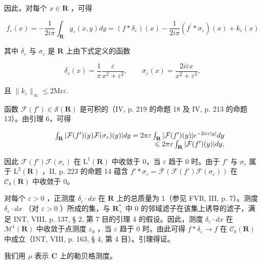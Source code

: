 因此，对每个 \(x \in \mathbf{R}\) ，可得

\[
f _ {\varepsilon} (x) = - \frac {1}{2 i \pi} \int_ {\mathbf {R}} g _ {\varepsilon} (x, y) d y = (f * \delta_ {\varepsilon}) (x) - \frac {1}{2 i \pi} (f ^ {\prime} * \sigma_ {\varepsilon}) (x) + k _ {\varepsilon} (x)
\]

其中 \(\delta_{\varepsilon}\) 与 \(\sigma_{\varepsilon}\) 是 \(\mathbf{R}\) 上由下式定义的函数

\[
\delta_ {\varepsilon} (x) = \frac {1}{\pi} \frac {\varepsilon}{x ^ {2} + \varepsilon^ {2}}, \qquad \sigma_ {\varepsilon} (x) = \frac {2 i \varepsilon x}{x ^ {2} + \varepsilon^ {2}},
\]

且 \(\| k_{\varepsilon}\|_{\infty}\leqslant 2\mathrm{Mr}\varepsilon .\)

函数 \(\mathcal{F}(f') \in \mathcal{S}(\mathbf{R})\) 是可积的（IV, p. 219 的命题 18 及 IV, p. 213 的命题 13）。由引理 6，可得

\[
\begin{array}{r l r} & & {\int_ {\mathbf {R}} | \mathcal {F} (f ^ {\prime}) (y) \mathcal {F} (\sigma_ {\varepsilon}) (y) | d y = 2 \pi \varepsilon \int_ {\mathbf {R}} | \mathcal {F} (f ^ {\prime}) (y) | e ^ {- 2 \pi \varepsilon | y |} d y} \\ & & {\leqslant 2 \pi \varepsilon \int_ {\mathbf {R}} | \mathcal {F} (f ^ {\prime}) (y) | d y,} \end{array}
\]

因此 \(\mathcal{F}(f')\mathcal{F}(\sigma_{\varepsilon})\) 在 \(\mathrm{L}^{1}(\mathbf{R})\) 中收敛于 0，当 \(\varepsilon\) 趋于 0 时。由于 \(f'\) 与 \(\sigma_{\varepsilon}\) 属于 \(\mathrm{L}^{2}(\mathbf{R})\) ，II, p. 223 的命题 14 蕴含 \(f'*\sigma_{\varepsilon}=\overline{\mathcal{F}}(\mathcal{F}(f')\mathcal{F}(\sigma_{\varepsilon}))\) 在 \(\mathcal{C}_{b}(\mathbf{R})\) 中收敛于 0。

对每个 \(\varepsilon > 0\) ，正测度 \(\delta_{\varepsilon} \cdot dx\) 在 \(\mathbf{R}\) 上的总质量为 1（参见 FVR, III, p. 7）。测度 \(\delta_{\varepsilon} \cdot dx\) （对 \(\varepsilon > 0\) ）所成的集，与 \(\mathbf{R}_{+}^{*}\) 中 0 的邻域滤子在该集上诱导的滤子，满足 INT, VIII, p. 137, § 2, 第 7 目的引理 4 的假设。因此，测度 \(\delta_{\varepsilon} \cdot dx\) 在 \(\mathcal{M}^{1}(\mathbf{R})\) 中收敛于点测度 \(\varepsilon_{0}\) ，当 \(\varepsilon\) 趋于 0 时。由此可得 \(f * \delta_{\varepsilon} \to f\) 在 \(\mathcal{C}_{b}(\mathbf{R})\) 中成立（INT, VIII, p. 163, § 4, 第 4 目）。引理得证。

我们用 \(\mu\) 表示 \(\mathbf{C}\) 上的勒贝格测度。

